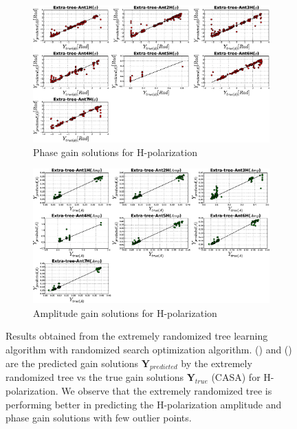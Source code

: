 \begin{figure}[H]
   \centering
    \begin{subfigure}[t]{0.52\textheight}
        
        \includegraphics[width=\textwidth]{images/Extra-treeHphase.eps} 
        \caption{Phase gain solutions for H-polarization} \label{A6}
    \end{subfigure}
    
      \begin{subfigure}[t]{0.52\textheight}
       
        \includegraphics[width=\textwidth]{images/Extra-treeHamp.eps} 
        \caption{Amplitude gain solutions for H-polarization} \label{B6}
    \end{subfigure}
    \caption{Results obtained from the extremely randomized tree learning algorithm with randomized search optimization algorithm. () and () are the predicted gain solutions $\textbf{Y}_{predicted}$ by the extremely randomized tree  vs the true gain solutions $\textbf{Y}_{true}$ (CASA) for H-polarization. We observe that the extremely randomized tree is performing better in predicting the H-polarization amplitude and phase gain solutions with few outlier points.}
    \label{BB7}
    \end{figure}
    
